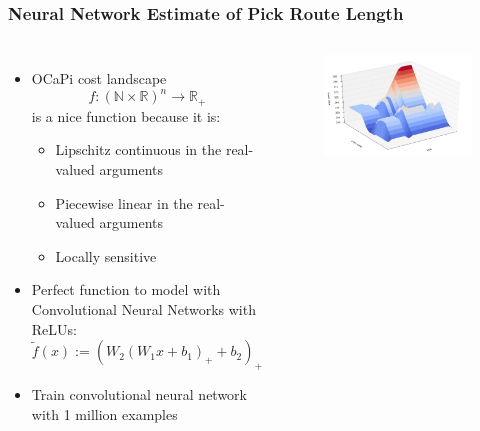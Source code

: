 \documentclass[english,a4,aspectratio=169]{beamer}
\begin{document}
\begin{frame}
 \frametitle{Neural Network Estimate of Pick Route Length}
  \begin{columns}[c]
  \begin{itemize}
  \item OCaPi cost landscape \[f:(\mathbb N\times\mathbb R)^n\to\mathbb R_+\] is a nice function because it is:
  \begin{itemize}
   \item Lipschitz continuous in the real-valued arguments
   \item Piecewise linear in the real-valued arguments
   \item Locally sensitive
  \end{itemize}
  \item<2-> Perfect function to model with Convolutional Neural Networks with ReLUs:
  \[\tilde f(x):=(W_2(W_1x+b_1)_{+} + b_2)_{+}\]
  \item<2-> Train convolutional neural network with 1 million examples
  \end{itemize}
  \begin{figure}
   \centering
   \includegraphics[width=\textwidth]{../figures/landscape_by_calvin.png}
   \end{figure}
  \end{columns}
\end{frame}
\end{document}
